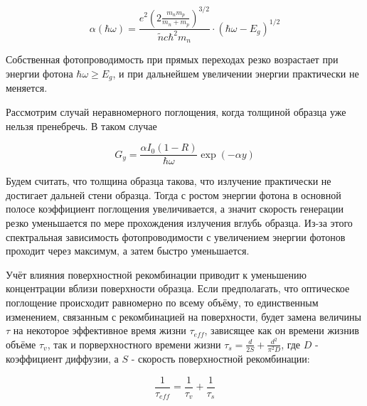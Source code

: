 \begin{equation}
\alpha(\hbar \omega) = \frac{e^2 \left( 2 \frac{m_{n} m_{p}}{m_{n} + m_{p}} \right)^{3/2}}{\tilde{n} c \hbar^2 m_{n}} \cdot (\hbar \omega - E_{g})^{1/2}
\end{equation}

Собственная фотопроводимость при прямых переходах резко возрастает при энергии фотона $\hbar \omega \ge E_{g}$, и при дальнейшем увеличении энергии практически не меняется.

Рассмотрим случай неравномерного поглощения, когда толщиной образца уже нельзя пренебречь. В таком случае

\begin{equation}
G_{y} = \frac{\alpha I_{0} (1-R)}{\hbar \omega} \exp(-\alpha y)
\end{equation}

Будем считать, что толщина образца такова, что излучение практически не достигает дальней стени образца. Тогда с ростом энергии фотона в основной полосе коэффициент поглощения увеличивается, а значит скорость генерации резко уменьшается по мере прохождения излучения вглубь образца. Из-за этого спектральная зависимость фотопроводимости с увеличением энергии фотонов проходит через максимум, а затем быстро уменьшается.

Учёт влияния поверхностной рекомбинации приводит к уменьшению концентрации вблизи поверхности образца. Если предполагать, что оптическое поглощение происходит равномерно по всему объёму, то единственным изменением, связанным с рекомбинацией на поверхности, будет замена величины $\tau$ на некоторое эффективное время жизни $\tau_{eff}$, зависящее как он времени жизнив объёме $\tau_{v}$, так и порверхностного времени жизни $\tau_{s} = \frac{d}{2 S} + \frac{d^2}{\pi^2 D}$, где $D$ - коэффициент диффузии, а $S$ - скорость поверхностной рекомбинации:

\begin{equation}
\frac{1}{\tau_{eff}} = \frac{1}{\tau_{v}} + \frac{1}{\tau_{s}}
\end{equation}

